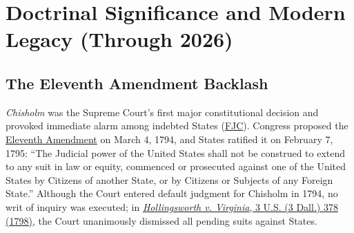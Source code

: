 \documentclass[12pt]{article}
\begin{document}
\section{Doctrinal Significance and Modern Legacy (Through 2026)}

\subsection{The Eleventh Amendment Backlash}
\emph{Chisholm} was the Supreme Court's first major constitutional decision and provoked immediate alarm among indebted States (\href{https://www.fjc.gov/history/cases/cases-that-shaped-the-federal-courts/chisholm-v-georgia}{FJC}). Congress proposed the \href{https://www.law.cornell.edu/constitution-conan/amendment-11/historical-background-on-eleventh-amendment}{Eleventh Amendment} on March 4, 1794, and States ratified it on February 7, 1795: ``The Judicial power of the United States shall not be construed to extend to any suit in law or equity, commenced or prosecuted against one of the United States by Citizens of another State, or by Citizens or Subjects of any Foreign State.'' Although the Court entered default judgment for Chisholm in 1794, no writ of inquiry was executed; in \href{https://supreme.justia.com/cases/federal/us/3/378/}{\emph{Hollingsworth v. Virginia}, 3 U.S. (3 Dall.) 378 (1798)}, the Court unanimously dismissed all pending suits against States.
\end{document}
